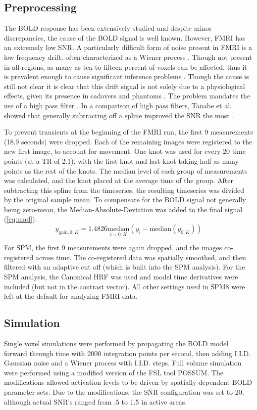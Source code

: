 \documentclass[journal]{./IEEEtran}
\begin{document}
\subsection{Preprocessing}
The BOLD response has been
extensively studied and despite minor discrepancies, the cause of the BOLD
signal is well known. However, FMRI has an extremely low SNR. 
A particularly difficult form of noise present 
in FMRI is a low frequency
drift, often characterized as a Wiener process \cite{Riera2004}.
Though not present in all regions, as many as ten to fifteen percent
of voxels can be affected, thus it is prevalent 
enough to cause significant inference problems \cite{Tanabe2002, Smith2007}. 
Though the cause is still not
clear it is clear that this drift signal is not solely
due to a physiological effects, given its presence in cadavers and phantoms
\cite{Smith1999}. The problem mandates the use of a high pass 
filter \cite{Smith2007}.  In a comparison of high pass filters,
Tanabe et al.  showed that generally subtracting off
a spline improved the SNR the most \cite{Tanabe2002}.

To prevent transients at the beginning of the FMRI run, the first 9
measurements (18.9 seconds) were dropped. Each of the remaining 
images were registered to the new first image, to account for
movement. 
One knot was used for every 20 time points (at a TR of 2.1), with the first
knot and last knot taking half as many points as the rest of the knots.
The median level of each group of measurements was calculated, and the
knot placed at the average time of the group. After subtracting this spline
from the timeseries, the resulting timeseries was divided by the original
sample mean. To compensate for the BOLD signal not generally being zero-mean,
the Median-Absolute-Deviation was added to the final signal (\autoref{eq:mad}). 
\begin{equation}
y_{\text{gain}, 0:K} = 1.4826\underset{i=0:K}{\text{median}}(y_i - \text{median}(y_{0:K}))
\label{eq:mad}
\end{equation}

For SPM, the first 9 measurements were again dropped, and the images
co-registered across time. The co-registered data was spatially smoothed,
and then filtered with an adaptive cut off (which is built into the
SPM analysis). For the SPM analysis, the Canonical HRF was used
and model time derivatives were included (but not in the contrast
vector). All other settings used in SPM8 were left at the default
for analyzing FMRI data.

\subsection{Simulation}
\label{sec:MethodsSim}
Single voxel simulations were performed by propagating the BOLD
model forward through time with 2000 integration points per
second, then adding I.I.D. Gaussian noise and a Wiener process
with I.I.D. steps. 
Full volume simulation were performed using 
a modified version of the FSL tool POSSUM. The modifications allowed
activation levels to be driven by spatially dependent BOLD parameter
sets. Due to the modifications, the SNR configuration was set to 20,
although actual SNR's ranged from .5 to 1.5 in active areas. 
\end{document}
